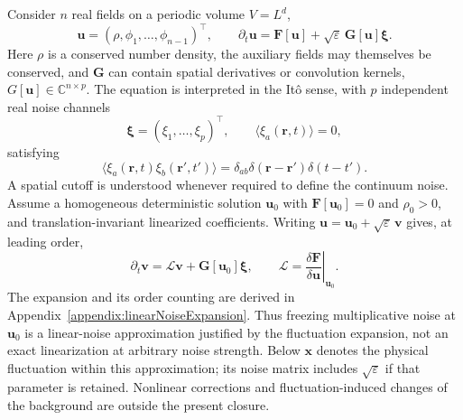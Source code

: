 \documentclass{article}
\begin{document}
Consider $n$ real fields on a periodic volume $V=L^d$,
\begin{equation}
    \mathbf u=(\rho,\phi_1,\ldots,\phi_{n-1})^{\top},
    \qquad \partial_t\mathbf u=\mathbf F[\mathbf u]
    +\sqrt{\varepsilon}\,\mathbf G[\mathbf u]\boldsymbol\xi.
    \label{eq:gfSPDE}
\end{equation}
Here $\rho$ is a conserved number density, the auxiliary fields may themselves be conserved, and $\mathbf G$ can contain spatial derivatives or convolution kernels, $G[\mathbf u]\in \mathbb{C}^{n\times p}$. The equation is interpreted in the It\^{o} sense, with $p$ independent real noise channels 
\begin{equation}
    \boldsymbol\xi=(\xi_1,\ldots,\xi_p)^{\top},
    \qquad \langle\xi_a(\mathbf r,t)\rangle=0,
\end{equation}
satisfying
\begin{equation}
    \langle\xi_a(\mathbf r,t)\xi_b(\mathbf r',t')\rangle
    =\delta_{ab}\delta(\mathbf r-\mathbf r')\delta(t-t').
\end{equation}
A spatial cutoff is understood whenever required to define the continuum noise. Assume a homogeneous deterministic solution $\mathbf u_0$ with $\mathbf F[\mathbf u_0]=0$ and $\rho_0>0$, and translation-invariant linearized coefficients. Writing $\mathbf u=\mathbf u_0+\sqrt{\varepsilon}\,\mathbf v$ gives, at leading order,
\begin{equation}
    \partial_t\mathbf v=\mathcal L\mathbf v+\mathbf G[\mathbf u_0]\boldsymbol\xi,
    \qquad \mathcal L=\left.\frac{\delta\mathbf F}{\delta\mathbf u}\right|_{\mathbf u_0}.
    \label{eq:gfLeadingFluctuation}
\end{equation}
The expansion and its order counting are derived in Appendix~\ref{appendix:linearNoiseExpansion}. Thus freezing multiplicative noise at $\mathbf u_0$ is a linear-noise approximation justified by the fluctuation expansion, not an exact linearization at arbitrary noise strength. Below $\mathbf x$ denotes the physical fluctuation within this approximation; its noise matrix includes $\sqrt{\varepsilon}$ if that parameter is retained. Nonlinear corrections and fluctuation-induced changes of the background are outside the present closure.
\end{document}
